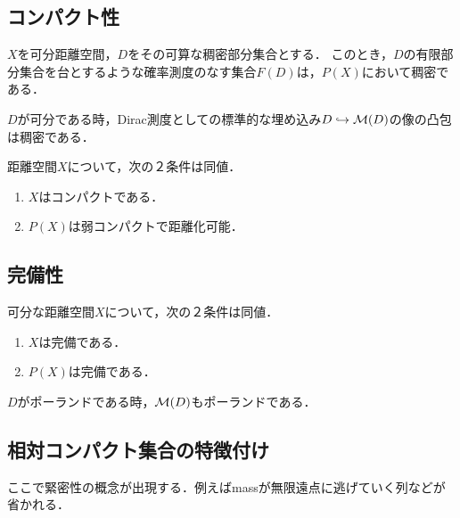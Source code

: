 \documentclass[uplatex,dvipdfmx]{jsreport}
\begin{document}
\subsection{コンパクト性}

\begin{theorem}[可算稠密部分集合の構成]
    $X$を可分距離空間，$D$をその可算な稠密部分集合とする．
    このとき，$D$の有限部分集合を台とするような確率測度のなす集合$F(D)$は，$P(X)$において稠密である．
\end{theorem}

\begin{corollary}
    $D$が可分である時，Dirac測度としての標準的な埋め込み$D\hookrightarrow\mathcal{M}(D)$の像の凸包は稠密である．
\end{corollary}

\begin{theorem}
    距離空間$X$について，次の２条件は同値．
    \begin{enumerate}
        \item $X$はコンパクトである．
        \item $P(X)$は弱コンパクトで距離化可能．
    \end{enumerate}
\end{theorem}

\subsection{完備性}

\begin{theorem}[完備性]
    可分な距離空間$X$について，次の２条件は同値．
    \begin{enumerate}
        \item $X$は完備である．
        \item $P(X)$は完備である．
    \end{enumerate}
\end{theorem}

\begin{theorem}
    $D$がポーランドである時，$\mathcal{M}(D)$もポーランドである．
\end{theorem}

\subsection{相対コンパクト集合の特徴付け}

\begin{tcolorbox}[colframe=ForestGreen, colback=ForestGreen!10!white,breakable,colbacktitle=ForestGreen!40!white,coltitle=black,fonttitle=\bfseries\sffamily,
title=]
    ここで緊密性の概念が出現する．例えばmassが無限遠点に逃げていく列などが省かれる．
\end{tcolorbox}
\end{document}
